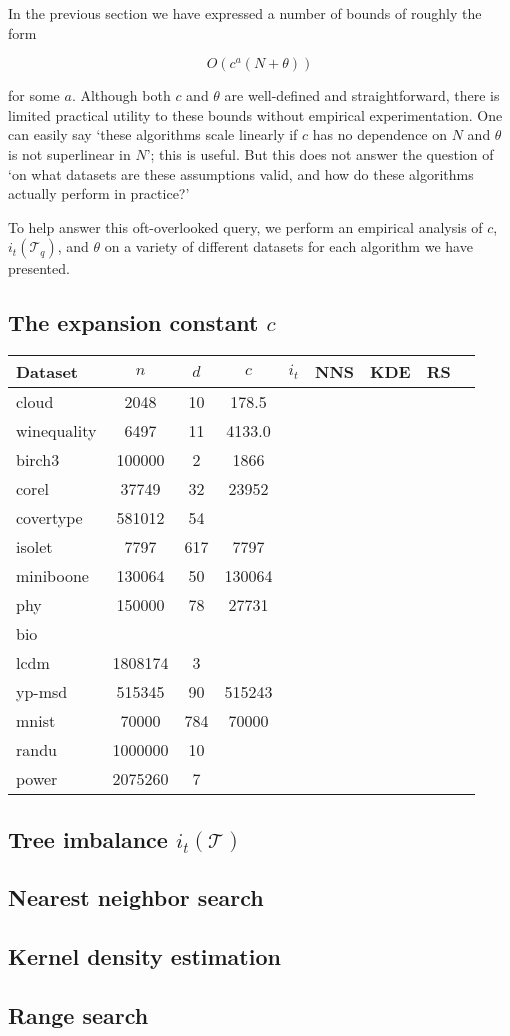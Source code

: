In the previous section we have expressed a number of bounds of roughly the form

\begin{equation}
O(c^a (N + \theta))
\end{equation}

\noindent for some $a$.  Although both $c$ and $\theta$ are well-defined and
straightforward, there is limited practical utility to these bounds without
empirical experimentation.  One can easily say `these algorithms scale linearly
if $c$ has no dependence on $N$ and $\theta$ is not superlinear in $N$'; this is
useful.  But this does not answer the question of `on what datasets are these
assumptions valid, and how do these algorithms actually perform in practice?'

To help answer this oft-overlooked query, we perform an empirical analysis of
$c$, $i_t(\mathscr{T}_q)$, and $\theta$ on a variety of different datasets for
each algorithm we have presented.

\subsection{The expansion constant $c$}

\begin{table}

\begin{tabular}{|l|c|c|c|c|c|c|c|c|}
\hline
{\bf Dataset} & {\bf $n$} & {\bf $d$} & {\bf $c$} & {\bf $i_t$} & {\bf NNS} & {\bf KDE} & {\bf RS} \\
\hline
cloud & 2048 & 10 & 178.5 & \\
winequality & 6497 & 11 & 4133.0 & \\
birch3 & 100000 & 2 & 1866 & \\
corel & 37749 & 32 & 23952 & \\
covertype & 581012 & 54 & \\
isolet & 7797 & 617 & 7797 & \\
miniboone & 130064 & 50 & 130064 & \\
phy & 150000 & 78 & 27731 & \\
bio & \\
lcdm & 1808174 & 3 & \\
yp-msd & 515345 & 90 & 515243 & \\
mnist & 70000 & 784 & 70000 & \\
randu & 1000000 & 10 & \\
power & 2075260 & 7 & \\
\end{tabular}
\end{table}

\subsection{Tree imbalance $i_t(\mathscr{T})$}

\subsection{Nearest neighbor search}

\subsection{Kernel density estimation}

\subsection{Range search}
